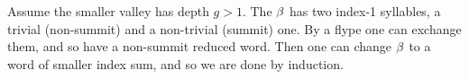\begin{caselist}
\case Assume the smaller valley has depth $g>1$.
The $\beta$ has two index-1 syllables, a trivial (non-summit)
and a non-trivial (summit) one. By a flype one can exchange
them, and so have a non-summit reduced word. Then one
can change $\beta$ to a word of smaller index sum, and so
we are done by induction.

% 
% 
% 
% 

\end{caselist}

